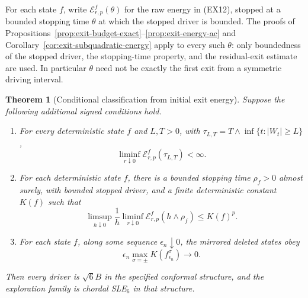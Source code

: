 \documentclass[11pt]{article}
\newtheorem{theorem}{Theorem}[section]
\theoremstyle{definition}\newtheorem{definition}[theorem]{Definition}
\theoremstyle{remark}\newtheorem{remark}[theorem]{Remark}
\begin{document}
For each state $f$, write $\mathcal E^f_{r,p}(\theta)$ for the raw energy
in (EX12), stopped at a bounded stopping time $\theta$ at which the
stopped driver is bounded.  The proofs of
Propositions~\ref{prop:exit-budget-exact}--\ref{prop:exit-energy-ac} and
Corollary~\ref{cor:exit-subquadratic-energy} apply to every such $\theta$:
only boundedness of the stopped driver, the stopping-time property, and
the residual-exit estimate are used. In particular $\theta$ need not
be exactly the first exit from a symmetric driving interval.

\begin{theorem}[Conditional classification from initial exit energy]
\label{thm:exit-energy-rigidity}
Suppose the following additional signed conditions hold.
\begin{enumerate}
\item For every deterministic state $f$ and $L,T>0$, with
 $\tau_{L,T}=T\wedge\inf\{t:|W_t|\ge L\}$,
 \[
  \liminf_{r\downarrow0}\mathcal E^f_{r,p}(\tau_{L,T})<\infty.
  \tag{ER1}
 \]
\item For each deterministic state $f$, there is a bounded stopping time
 $\rho_f>0$ almost surely, with bounded stopped driver, and a finite
 deterministic constant $K(f)$ such that
 \[
  \limsup_{h\downarrow0}\frac1h
       \liminf_{r\downarrow0}\mathcal E^f_{r,p}(h\wedge\rho_f)
                \le K(f)^p.
  \tag{ER2}
 \]
\item For each state $f$, along some sequence $\epsilon_n\downarrow0$,
 the mirrored deleted states obey
 \[
  \epsilon_n\max_{\sigma=\pm}K(f_{\epsilon_n}^{\sigma})
                    \longrightarrow0.
  \tag{ER3}
 \]
\end{enumerate}
Then every driver is $\sqrt6 B$ in the specified conformal structure,
and the exploration family is chordal SLE$_6$ in that structure.
\end{theorem}
\end{document}
